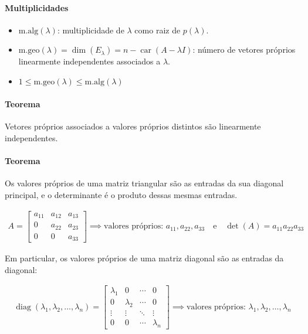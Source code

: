 \documentclass{article}
\begin{document}
\paragraph{Multiplicidades}

\begin{itemize}
    \item $\text{m.alg}(\lambda)$: multiplicidade de $\lambda$ como raiz de $p(\lambda)$.
    \item $\text{m.geo}(\lambda) = \dim(E_\lambda) = n - \operatorname{car}(A - \lambda I)$: número de
    vetores próprios linearmente independentes associados a $\lambda$.
    \item $1 \leq \text{m.geo}(\lambda) \leq \text{m.alg}(\lambda)$
\end{itemize}

\paragraph{Teorema}

Vetores próprios associados a valores próprios distintos são linearmente independentes.

\paragraph{Teorema}

Os valores próprios de uma matriz triangular são as entradas da sua diagonal principal, e o determinante é o
produto dessas mesmas entradas.

\begin{gather*}
A =
\begin{bmatrix}
a_{11} & a_{12} & a_{13} \\
0 & a_{22} & a_{23} \\
0 & 0 & a_{33}
\end{bmatrix}
\implies
\text{valores próprios: } a_{11}, a_{22}, a_{33}
\quad \text{e} \quad
\det(A) = a_{11} a_{22} a_{33}
\end{gather*}

Em particular, os valores próprios de uma matriz diagonal são as entradas da diagonal:

\begin{gather*}
\operatorname{diag}(\lambda_1, \lambda_2, \ldots, \lambda_n) =
\begin{bmatrix}
\lambda_1 & 0 & \cdots & 0 \\
0 & \lambda_2 & \cdots & 0 \\
\vdots & \vdots & \ddots & \vdots \\
0 & 0 & \cdots & \lambda_n
\end{bmatrix}
\implies
\text{valores próprios: } \lambda_1, \lambda_2, \ldots, \lambda_n
\end{gather*}
\end{document}
